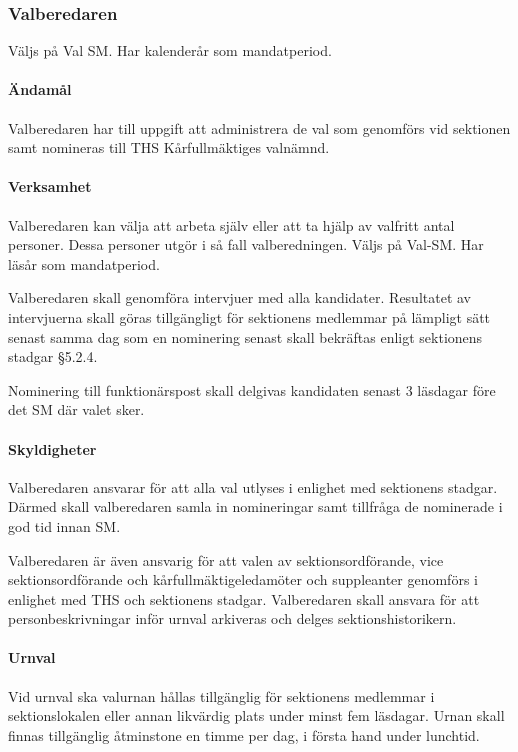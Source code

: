 \documentclass{dgovdoc}
\begin{document}
\subsubsection{Valberedaren}

Väljs på Val SM. Har kalenderår som mandatperiod.

\paragraph{Ändamål}

Valberedaren har till uppgift att administrera de val som genomförs vid sektionen samt nomineras till THS Kårfullmäktiges valnämnd.

\paragraph{Verksamhet}

Valberedaren kan välja att arbeta själv eller att ta hjälp av valfritt antal personer. Dessa personer utgör i så fall valberedningen. Väljs på Val-SM. Har läsår som mandatperiod.

Valberedaren skall genomföra intervjuer med alla kandidater.
Resultatet av intervjuerna skall göras tillgängligt för sektionens medlemmar på lämpligt sätt
senast samma dag som en nominering senast skall bekräftas enligt sektionens stadgar \S5.2.4.

Nominering till funktionärspost skall delgivas kandidaten senast 3 läsdagar före det SM där valet sker.

\paragraph{Skyldigheter}

Valberedaren ansvarar för att alla val utlyses i enlighet med sektionens stadgar. Därmed skall valberedaren samla in nomineringar samt tillfråga de nominerade i god tid innan SM.

Valberedaren är även ansvarig för att valen av sektionsordförande, vice sektionsordförande och kårfullmäktigeledamöter och suppleanter genomförs i enlighet med THS och sektionens stadgar. Valberedaren skall ansvara för att personbeskrivningar inför urnval arkiveras och delges sektionshistorikern.

\paragraph{Urnval}

Vid urnval ska valurnan hållas tillgänglig för sektionens medlemmar i sektionslokalen eller annan likvärdig plats under minst fem läsdagar. Urnan skall finnas tillgänglig åtminstone en timme per dag, i första hand under lunchtid.
\end{document}
